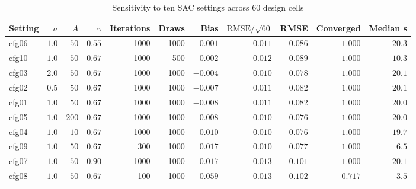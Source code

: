 \begin{table}[htbp]\centering
\caption{Sensitivity to ten SAC settings across 60 design cells}\label{tab:s3-step}
{\footnotesize\setlength{\tabcolsep}{4pt}\begin{tabular}{lrrrrrrrrrr}
\toprule
Setting & $a$ & $A$ & $\gamma$ & Iterations & Draws & Bias & $\mathrm{RMSE}/\sqrt{60}$ & RMSE & Converged & Median s \\
\midrule
cfg06 & $1.0$ & $50$ & $0.55$ & 1000 & 1000 & $-0.001$ & $0.011$ & $0.086$ & $1.000$ & $20.3$ \\
cfg10 & $1.0$ & $50$ & $0.67$ & 1000 & 500 & $0.002$ & $0.012$ & $0.089$ & $1.000$ & $10.3$ \\
cfg03 & $2.0$ & $50$ & $0.67$ & 1000 & 1000 & $-0.004$ & $0.010$ & $0.078$ & $1.000$ & $20.1$ \\
cfg02 & $0.5$ & $50$ & $0.67$ & 1000 & 1000 & $-0.007$ & $0.011$ & $0.082$ & $1.000$ & $20.1$ \\
cfg01 & $1.0$ & $50$ & $0.67$ & 1000 & 1000 & $-0.008$ & $0.011$ & $0.082$ & $1.000$ & $20.0$ \\
cfg05 & $1.0$ & $200$ & $0.67$ & 1000 & 1000 & $0.008$ & $0.010$ & $0.076$ & $1.000$ & $20.0$ \\
cfg04 & $1.0$ & $10$ & $0.67$ & 1000 & 1000 & $-0.010$ & $0.010$ & $0.076$ & $1.000$ & $19.7$ \\
cfg09 & $1.0$ & $50$ & $0.67$ & 300 & 1000 & $0.017$ & $0.010$ & $0.077$ & $1.000$ & $6.5$ \\
cfg07 & $1.0$ & $50$ & $0.90$ & 1000 & 1000 & $0.017$ & $0.013$ & $0.101$ & $1.000$ & $20.1$ \\
cfg08 & $1.0$ & $50$ & $0.67$ & 100 & 1000 & $0.059$ & $0.013$ & $0.102$ & $0.717$ & $3.5$ \\
\bottomrule
\end{tabular}}
\end{table}

